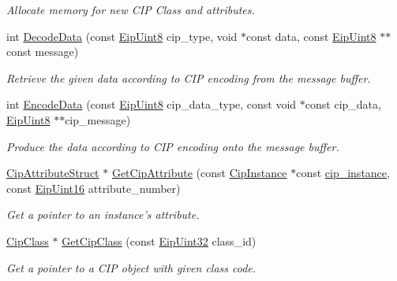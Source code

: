 \begin{DoxyCompactItemize}
\begin{DoxyCompactList}\small\item\em \-Allocate memory for new \-C\-I\-P \-Class and attributes. \end{DoxyCompactList}\item 
int \hyperlink{group__CIP__API_ga23ef471671180123d441d30895159a3c}{\-Decode\-Data} (const \hyperlink{typedefs_8h_aa0c108ee762a27720919a4634643040e}{\-Eip\-Uint8} cip\-\_\-type, void $\ast$const data, const \hyperlink{typedefs_8h_aa0c108ee762a27720919a4634643040e}{\-Eip\-Uint8} $\ast$$\ast$const message)
\begin{DoxyCompactList}\small\item\em \-Retrieve the given data according to \-C\-I\-P encoding from the message buffer. \end{DoxyCompactList}\item 
int \hyperlink{group__CIP__API_gaece1b7dd2aeec306cb33b86b2ee21980}{\-Encode\-Data} (const \hyperlink{typedefs_8h_aa0c108ee762a27720919a4634643040e}{\-Eip\-Uint8} cip\-\_\-data\-\_\-type, const void $\ast$const cip\-\_\-data, \hyperlink{typedefs_8h_aa0c108ee762a27720919a4634643040e}{\-Eip\-Uint8} $\ast$$\ast$cip\-\_\-message)
\begin{DoxyCompactList}\small\item\em \-Produce the data according to \-C\-I\-P encoding onto the message buffer. \end{DoxyCompactList}\item 
\hyperlink{structCipAttributeStruct}{\-Cip\-Attribute\-Struct} $\ast$ \hyperlink{group__CIP__API_ga5a14c8d76acacb09312b709bb0a76265}{\-Get\-Cip\-Attribute} (const \hyperlink{ciptypes_8h_aea7976be629e5ece275c993982186188}{\-Cip\-Instance} $\ast$const \hyperlink{structcip__instance}{cip\-\_\-instance}, const \hyperlink{typedefs_8h_ac1b4cfa25b4f5def62f23b455dd395d8}{\-Eip\-Uint16} attribute\-\_\-number)
\begin{DoxyCompactList}\small\item\em \-Get a pointer to an instance's attribute. \end{DoxyCompactList}\item 
\hyperlink{ciptypes_8h_a175191808b8fac50b47d9bbc9edc6051}{\-Cip\-Class} $\ast$ \hyperlink{group__CIP__API_ga98bd609c80ece316406363575b4a89ea}{\-Get\-Cip\-Class} (const \hyperlink{typedefs_8h_abf2dd49262551294eb990ef8746a2767}{\-Eip\-Uint32} class\-\_\-id)
\begin{DoxyCompactList}\small\item\em \-Get a pointer to a \-C\-I\-P object with given class code. \end{DoxyCompactList}\item 

\end{DoxyCompactItemize}
